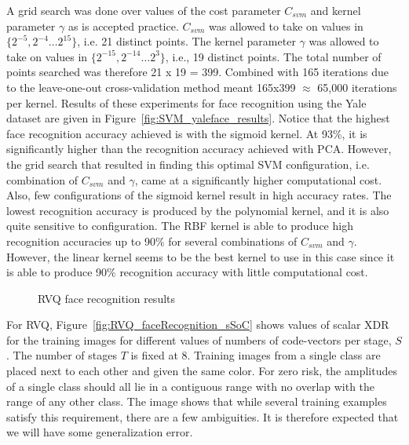 A grid search was done over values of the cost parameter $C_{svm}$ and kernel parameter $\gamma$ as is accepted practice.  $C_{svm}$ was allowed to take on values in $\{2^{-5}, 2^{-4} \ldots 2^{15}\}$, i.e. 21 distinct points.  The kernel parameter $\gamma$ was allowed to take on values in $\{2^{-15}, 2^{-14} \ldots 2^{3}\}$, i.e., 19 distinct points.  The total number of points searched was therefore 21 x 19 = 399.  Combined with 165 iterations due to the leave-one-out cross-validation method meant 165x399 $\approx$ 65,000 iterations per kernel.  Results of these experiments for face recognition using the Yale dataset are given in Figure~\ref{fig:SVM_yaleface_results}.  Notice that the highest face recognition accuracy achieved is with the sigmoid kernel.  At 93\%, it is significantly higher than the recognition accuracy achieved with PCA.  However, the grid search that resulted in finding this optimal SVM configuration, i.e. combination of $C_{svm}$ and $\gamma$, came at a significantly higher computational cost.  Also, few configurations of the sigmoid kernel result in high accuracy rates.  The lowest recognition accuracy is produced by the polynomial kernel, and it is also quite sensitive to configuration.  The RBF kernel is able to produce high recognition accuracies up to 90\% for several combinations of $C_{svm}$ and $\gamma$.  However, the linear kernel seems to be the best kernel to use in this case since it is able to produce 90\% recognition accuracy with little computational cost.

											\begin{figure}[t]
											\centering
											\caption{RVQ face recognition results}
											\label{fig:RVQ_yaleface_results}
											\end{figure}


For RVQ, Figure~\ref{fig:RVQ_faceRecognition_sSoC} shows values of scalar XDR for the training images for different values of numbers of code-vectors per stage, $S$.  The number of stages $T$ is fixed at 8.  Training images from a single class are placed next to each other and given the same color.  For zero risk, the amplitudes of a single class should all lie in a contiguous range with no overlap with the range of any other class.  The image shows that while several training examples satisfy this requirement, there are a few ambiguities.  It is therefore expected that we will have some generalization error.

